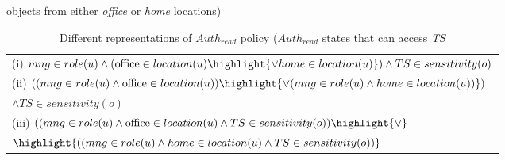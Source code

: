 

 
\begin{table}
	\centering
	\caption{ Different representations of  $Auth_{read}$ policy  ($Auth_{read}$ states that \textit{\manager} can access \textit{TS}} objects  from either \textit{office} or \textit{home} locations) 

	
	\label{tab:LAP-heterogeneity}
	\begin{tabular}{|l|}						
		\hline					
			
			(i) $  \manager \in role(u) \land (\office{} \in location(u) \highlight {\lor home \in location(u)})  \land TS \in sensitivity(o)$ \\
			(ii) $((\manager \in role(u) \land \office{} \in location(u) ) \highlight {\lor (\manager \in role(u) \land home \in location(u) )}  )$ \\ \hfill $ \land TS \in sensitivity(o)$\\
			(iii) $((\manager \in role(u) \land \office{} \in location(u) \land TS \in sensitivity(o) ) \highlight{\lor}$  \\ \hfill $\highlight{((\manager \in role(u) \land home \in location(u) \land TS \in sensitivity(o) )}$ \\
		 \hline	
	\end{tabular}	

	
\end{table}
